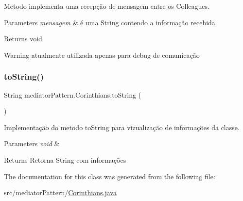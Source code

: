Metodo implementa uma recepção de mensagem entre os Colleagues. 


\begin{DoxyParams}{Parameters}
{\em mensagem} & é uma String contendo a informação recebida \\
\hline
\end{DoxyParams}
\begin{DoxyReturn}{Returns}
void 
\end{DoxyReturn}
\begin{DoxyWarning}{Warning}
atualmente utilizada apenas para debug de comunicação 
\end{DoxyWarning}
\mbox{\label{classmediator_pattern_1_1_corinthians_a577a8ad3ad251a634cc7a7b59c9e64eb}} 
\subsubsection{\texorpdfstring{toString()}{toString()}}
{\footnotesize\ttfamily String mediator\+Pattern.\+Corinthians.\+to\+String (\begin{DoxyParamCaption}{ }\end{DoxyParamCaption})}



Implementação do metodo to\+String para vizualização de informações da classe. 


\begin{DoxyParams}{Parameters}
{\em void} & \\
\hline
\end{DoxyParams}
\begin{DoxyReturn}{Returns}
Retorna String com informações 
\end{DoxyReturn}


The documentation for this class was generated from the following file\+:\begin{DoxyCompactItemize}
\item 
src/mediator\+Pattern/\mbox{\hyperlink{_corinthians_8java}{Corinthians.\+java}}\end{DoxyCompactItemize}
